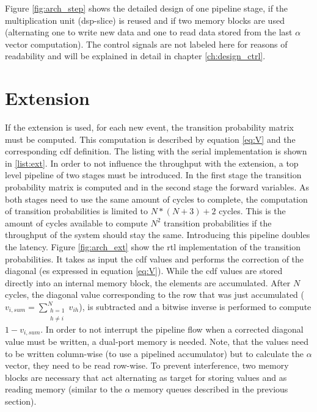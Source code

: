 \documentclass[mscthesis]{usiinfthesis}
\begin{document}
Figure \ref{fig:arch_step} shows the detailed design of one pipeline stage, if
the multiplication unit (\gls{dsp}-slice) is reused and if two memory blocks
are used (alternating one to write new data and one to read data stored from
the last $\alpha$ vector computation). The control signals are not labeled here
for reasons of readability and will be explained in detail in chapter
\ref{ch:design_ctrl}.

\section{Extension}
\label{ch:design_ext}

If the extension is used, for each new event, the transition probability matrix
must be computed. This computation is described by equation \ref{eq:V} and the
corresponding \gls{cdf} definition. The listing with the serial implementation
is shown in \ref{list:ext}. In order to not influence the throughput with the
extension, a top level pipeline of two stages must be introduced. In the first
stage the transition probability matrix is computed and in the second stage the
forward variables. As both stages need to use the same amount of cycles to
complete, the computation of transition probabilities is limited to $N*(N+3)+2$
cycles. This is the amount of cycles available to compute $N^2$ transition
probabilities if the throughput of the system should stay the same. Introducing
this pipeline doubles the latency. Figure \ref{fig:arch_ext} show the \gls{rtl}
implementation of the transition probabilities. It takes as input the \gls{cdf}
values and performs the correction of the diagonal (es expressed in equation
\ref{eq:V}). While the \gls{cdf} values are stored directly into an internal
memory block, the elements are accumulated. After $N$ cycles, the diagonal
value corresponding to the row that was just accumulated ($v_{i, sum}
= \sum\limits_{\substack{h=1 \\ h \neq i}}^{N} v_{ih}$), is subtracted and
a bitwise inverse is performed to compute $1 - v_{i, sum}$. In order to not
interrupt the pipeline flow when a corrected diagonal value must be written,
a dual-port memory is needed. Note, that the values need to be written
column-wise (to use a pipelined accumulator) but to calculate the $\alpha$
vector, they need to be read row-wise. To prevent interference, two memory
blocks are necessary that act alternating as target for storing values and as
reading memory (similar to the $\alpha$ memory queues described in the previous
section).
\end{document}
